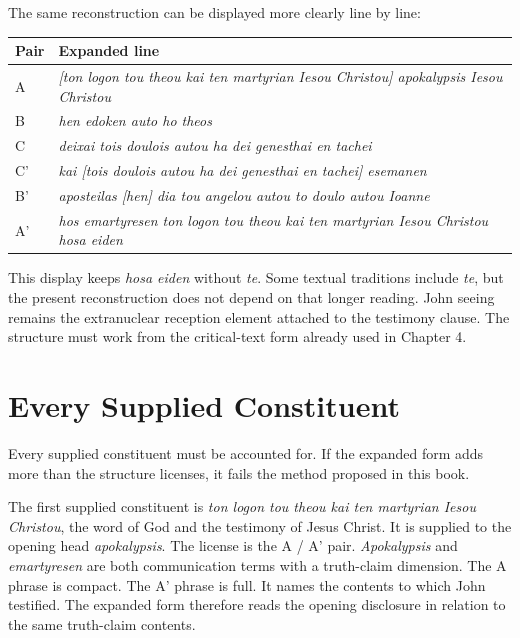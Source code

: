 The same reconstruction can be displayed more clearly line by line:

\begin{center}
\begin{longtable}{@{}p{}p{}@{}}
\toprule
Pair & Expanded line \\
\midrule
A & \textit{[ton logon tou theou kai ten martyrian Iesou Christou] apokalypsis Iesou Christou} \\
B & \textit{hen edoken auto ho theos} \\
C & \textit{deixai tois doulois autou ha dei genesthai en tachei} \\
C' & \textit{kai [tois doulois autou ha dei genesthai en tachei] esemanen} \\
B' & \textit{aposteilas [hen] dia tou angelou autou to doulo autou Ioanne} \\
A' & \textit{hos emartyresen ton logon tou theou kai ten martyrian Iesou Christou hosa eiden} \\
\bottomrule
\end{longtable}
\end{center}

This display keeps \textit{hosa eiden} without \textit{te}. Some textual traditions include \textit{te}, but the present reconstruction does not depend on that longer reading. John seeing remains the extranuclear reception element attached to the testimony clause. The structure must work from the critical-text form already used in Chapter 4.

\section{Every Supplied Constituent}

Every supplied constituent must be accounted for. If the expanded form adds more than the structure licenses, it fails the method proposed in this book.

The first supplied constituent is \textit{ton logon tou theou kai ten martyrian Iesou Christou}, the word of God and the testimony of Jesus Christ. It is supplied to the opening head \textit{apokalypsis}. The license is the A / A' pair. \textit{Apokalypsis} and \textit{emartyresen} are both communication terms with a truth-claim dimension. The A phrase is compact. The A' phrase is full. It names the contents to which John testified. The expanded form therefore reads the opening disclosure in relation to the same truth-claim contents.

